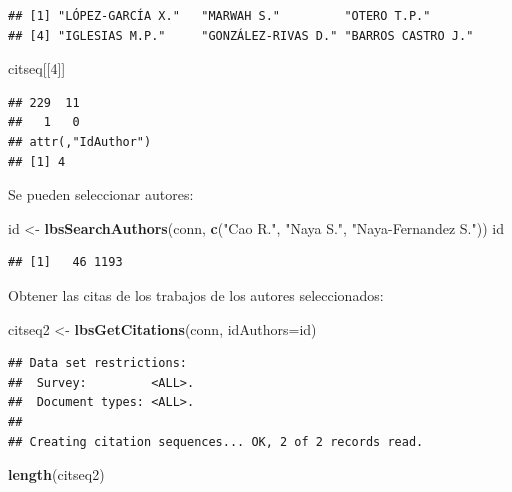 \documentclass[
]{book}
\newenvironment{Shaded}{\begin{snugshade}}{\end{snugshade}}
\newcommand{\AttributeTok}[1]{\textcolor[rgb]{0.13,0.29,0.53}{#1}}
\newcommand{\DecValTok}[1]{\textcolor[rgb]{0.00,0.00,0.81}{#1}}
\newcommand{\FunctionTok}[1]{\textcolor[rgb]{0.13,0.29,0.53}{\textbf{#1}}}
\newcommand{\NormalTok}[1]{#1}
\newcommand{\OtherTok}[1]{\textcolor[rgb]{0.56,0.35,0.01}{#1}}
\newcommand{\StringTok}[1]{\textcolor[rgb]{0.31,0.60,0.02}{#1}}
\begin{document}
\begin{verbatim}
## [1] "LÓPEZ-GARCÍA X."   "MARWAH S."         "OTERO T.P."       
## [4] "IGLESIAS M.P."     "GONZÁLEZ-RIVAS D." "BARROS CASTRO J."
\end{verbatim}

\begin{Shaded}
\begin{Highlighting}[]
\NormalTok{citseq[[}\DecValTok{4}\NormalTok{]]}
\end{Highlighting}
\end{Shaded}

\begin{verbatim}
## 229  11 
##   1   0 
## attr(,"IdAuthor")
## [1] 4
\end{verbatim}

Se pueden seleccionar autores:

\begin{Shaded}
\begin{Highlighting}[]
\NormalTok{id }\OtherTok{\textless{}{-}} \FunctionTok{lbsSearchAuthors}\NormalTok{(conn, }\FunctionTok{c}\NormalTok{(}\StringTok{"Cao R."}\NormalTok{, }\StringTok{"Naya S."}\NormalTok{, }\StringTok{"Naya{-}Fernandez S."}\NormalTok{))}
\NormalTok{id}
\end{Highlighting}
\end{Shaded}

\begin{verbatim}
## [1]   46 1193
\end{verbatim}

Obtener las citas de los trabajos de los autores seleccionados:

\begin{Shaded}
\begin{Highlighting}[]
\NormalTok{citseq2 }\OtherTok{\textless{}{-}} \FunctionTok{lbsGetCitations}\NormalTok{(conn, }\AttributeTok{idAuthors=}\NormalTok{id)}
\end{Highlighting}
\end{Shaded}

\begin{verbatim}
## Data set restrictions:
##  Survey:         <ALL>.
##  Document types: <ALL>.
## 
## Creating citation sequences... OK, 2 of 2 records read.
\end{verbatim}

\begin{Shaded}
\begin{Highlighting}[]
\FunctionTok{length}\NormalTok{(citseq2)}
\end{Highlighting}
\end{Shaded}
\end{document}
